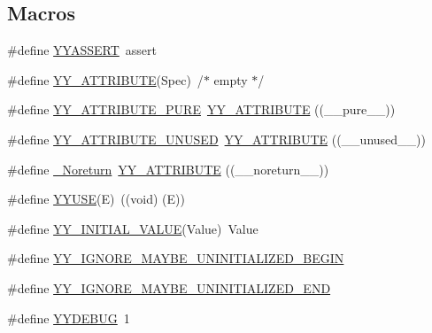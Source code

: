 \subsection*{Macros}
\begin{DoxyCompactItemize}
\item 
\#define \hyperlink{_genesys_09_09-parser_8h_afd603ddcf170a7d46a33d9d780d18a4b}{Y\-Y\-A\-S\-S\-E\-R\-T}~assert
\item 
\#define \hyperlink{_genesys_09_09-parser_8h_a9b07478214400ec2e160dffd1d945266}{Y\-Y\-\_\-\-A\-T\-T\-R\-I\-B\-U\-T\-E}(Spec)~/$\ast$ empty $\ast$/
\item 
\#define \hyperlink{_genesys_09_09-parser_8h_ad1405f082b8df6353a9d53c9709c4d03}{Y\-Y\-\_\-\-A\-T\-T\-R\-I\-B\-U\-T\-E\-\_\-\-P\-U\-R\-E}~\hyperlink{_genesys_09_09-parser_8h_a9b07478214400ec2e160dffd1d945266}{Y\-Y\-\_\-\-A\-T\-T\-R\-I\-B\-U\-T\-E} ((\-\_\-\-\_\-pure\-\_\-\-\_\-))
\item 
\#define \hyperlink{_genesys_09_09-parser_8h_ab312a884bd41ff11bbd1aa6c1a0e1b0a}{Y\-Y\-\_\-\-A\-T\-T\-R\-I\-B\-U\-T\-E\-\_\-\-U\-N\-U\-S\-E\-D}~\hyperlink{_genesys_09_09-parser_8h_a9b07478214400ec2e160dffd1d945266}{Y\-Y\-\_\-\-A\-T\-T\-R\-I\-B\-U\-T\-E} ((\-\_\-\-\_\-unused\-\_\-\-\_\-))
\item 
\#define \hyperlink{_genesys_09_09-parser_8h_afdc60192553b70b37149691b71022d5a}{\-\_\-\-Noreturn}~\hyperlink{_genesys_09_09-parser_8h_a9b07478214400ec2e160dffd1d945266}{Y\-Y\-\_\-\-A\-T\-T\-R\-I\-B\-U\-T\-E} ((\-\_\-\-\_\-noreturn\-\_\-\-\_\-))
\item 
\#define \hyperlink{_genesys_09_09-parser_8h_a33c61e326f5675cc74eb9e1a6906595c}{Y\-Y\-U\-S\-E}(E)~((void) (E))
\item 
\#define \hyperlink{_genesys_09_09-parser_8h_a6d890db48971847b837a6a1397c9059a}{Y\-Y\-\_\-\-I\-N\-I\-T\-I\-A\-L\-\_\-\-V\-A\-L\-U\-E}(Value)~Value
\item 
\#define \hyperlink{_genesys_09_09-parser_8h_a145ddbb780f86b5f35ddfffb23e62d4d}{Y\-Y\-\_\-\-I\-G\-N\-O\-R\-E\-\_\-\-M\-A\-Y\-B\-E\-\_\-\-U\-N\-I\-N\-I\-T\-I\-A\-L\-I\-Z\-E\-D\-\_\-\-B\-E\-G\-I\-N}
\item 
\#define \hyperlink{_genesys_09_09-parser_8h_a2b2abbe8d335b7933a69ac2f05a015d2}{Y\-Y\-\_\-\-I\-G\-N\-O\-R\-E\-\_\-\-M\-A\-Y\-B\-E\-\_\-\-U\-N\-I\-N\-I\-T\-I\-A\-L\-I\-Z\-E\-D\-\_\-\-E\-N\-D}
\item 
\#define \hyperlink{_genesys_09_09-parser_8h_a853b3bfad6d2b2ff693dce81182e0c2e}{Y\-Y\-D\-E\-B\-U\-G}~1
\end{DoxyCompactItemize}


